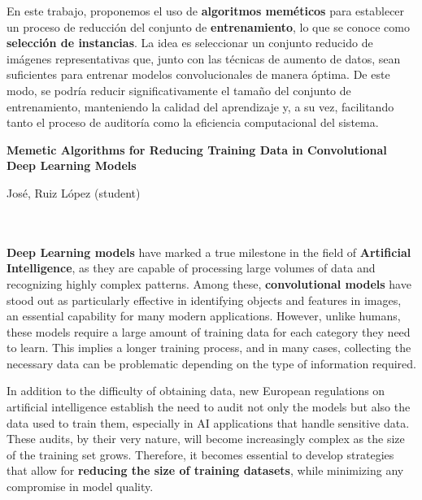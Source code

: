 En este trabajo, proponemos el uso de \textbf{algoritmos meméticos} para establecer un proceso de reducción del conjunto de
\textbf{entrenamiento}, lo que se conoce como \textbf{selección de instancias}.
La idea es seleccionar un conjunto reducido de imágenes representativas que, junto con las técnicas de aumento de
datos, sean suficientes para entrenar modelos convolucionales de manera óptima.
De este modo, se podría reducir significativamente el tamaño del conjunto de entrenamiento, manteniendo la calidad
del aprendizaje y, a su vez, facilitando tanto el proceso de auditoría como la eficiencia computacional del sistema.


\cleardoublepage


\thispagestyle{empty}


\begin{center}
       {\large\bfseries Memetic Algorithms for Reducing Training Data in Convolutional Deep Learning Models}\\
\end{center}
\begin{center}
       José, Ruiz López (student)\\
\end{center}

\\

\vspace{0.7cm}
\\

\textbf{Deep Learning models} have marked a true milestone in the field of \textbf{Artificial Intelligence}, as they are capable of 
processing large volumes of data and recognizing highly complex patterns.
Among these, \textbf{convolutional models} have stood out as particularly effective in identifying objects and
features in images, an essential capability for many modern applications.
However, unlike humans, these models require a large amount of training data for each category they need to learn.
This implies a longer training process, and in many cases, collecting the necessary data can be problematic depending
on the type of information required.

In addition to the difficulty of obtaining data, new European regulations on artificial intelligence establish the need to 
audit not only the models but also the data used to train them, especially in AI applications that handle sensitive data.
These audits, by their very nature, will become increasingly complex as the size of the training set grows.
Therefore, it becomes essential to develop strategies that allow for \textbf{reducing the size of training datasets}, 
while minimizing any compromise in model quality.

